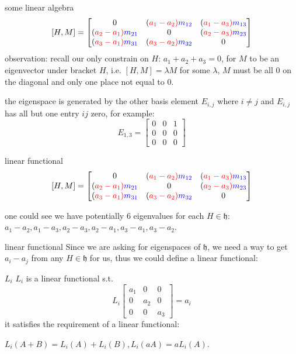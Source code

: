 \documentclass{beamer}
\begin{document}
\begin{frame}{some linear algebra}
	\[ [H,M] = \def\a{\color{red}a} \def\m{\color{blue}m} \begin{bmatrix} 0& (\a_1-\a_2)\m_{12} & (\a_1-\a_3)\m_{13} \\ (\a_2-\a_1)\m_{21} & 0& (\a_2-\a_3)\m_{23} \\ (\a_3-\a_1)\m_{31} & (\a_3-\a_2)\m_{32} & 0 \end{bmatrix} \] 
	\def\a{\color{red}a}
	observation: recall our only constrain on $H$:  $a_1+a_2+a_3=0$, for $M$ to be an eigenvector under bracket  $H$, i.e.  $[H,M] = \lambda M$ for some  $\lambda$,  $M$ must be all  $0$ on the diagonal and only one place not equal to  $0$. 

the eigenspace is generated by the other basis element  $E_{i,j}$ where $i \neq j$ and $E_{i,j}$ has all but one entry $ij$ zero, for example:  \[
		E_{1,3} = \begin{bmatrix} 0 & 0 & 1 \\ 0 & 0 &0 \\ 0 &0 &0 \end{bmatrix} 
	\] 
\end{frame}

\begin{frame}{linear functional}	
	\[ [H,M] = \def\a{\color{red}a} \def\m{\color{blue}m} \begin{bmatrix} 0& (\a_1-\a_2)\m_{12} & (\a_1-\a_3)\m_{13} \\ (\a_2-\a_1)\m_{21} & 0& (\a_2-\a_3)\m_{23} \\ (\a_3-\a_1)\m_{31} & (\a_3-\a_2)\m_{32} & 0 \end{bmatrix} \]

	one could see we have potentially $6$ eigenvalues for each  $H \in \mathfrak{h}$: $a_1-a_2, a_1-a_3, a_2-a_3, a_2-a_1, a_3-a_1, a_3-a_2$. 

\end{frame}


\begin{frame}{linear functional}	
	Since we are asking for  eigenspaces of $\mathfrak{h}$, we need a way to get  $a_i-a_j$ from any  $H \in \mathfrak{h}$ for us, thus we could define a linear functional:

	\begin{defn}{$L_i$}{}
	$L_i$ is a linear functional s.t. \[
		L_i \begin{bmatrix} a_1 & 0 &0 \\ 0 & a_2 & 0 \\ 0 &0 &a_3 \end{bmatrix} = a_i 
	\] it satisfies the requirement of a linear functional: 

	$L_i(A+B) = L_i(A) + L_i(B), L_i(aA) = aL_i(A)$.
	\end{defn}
\end{frame}
\end{document}
